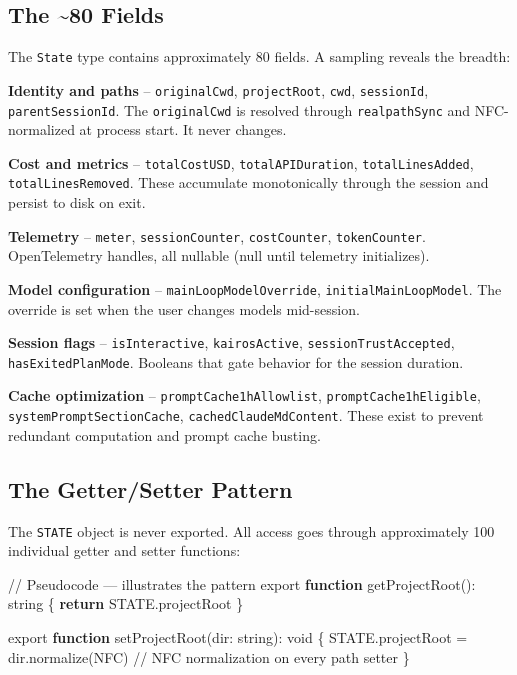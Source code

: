 \documentclass[
  english,
  11pt,
  letterpaper,
]{book}
\newenvironment{Shaded}{\begin{snugshade}}{\end{snugshade}}
\newcommand{\AttributeTok}[1]{\textcolor[rgb]{0.40,0.45,0.13}{#1}}
\newcommand{\CommentTok}[1]{\textcolor[rgb]{0.37,0.37,0.37}{#1}}
\newcommand{\ControlFlowTok}[1]{\textcolor[rgb]{0.00,0.23,0.31}{\textbf{#1}}}
\newcommand{\DataTypeTok}[1]{\textcolor[rgb]{0.68,0.00,0.00}{#1}}
\newcommand{\FunctionTok}[1]{\textcolor[rgb]{0.28,0.35,0.67}{#1}}
\newcommand{\ImportTok}[1]{\textcolor[rgb]{0.00,0.46,0.62}{#1}}
\newcommand{\KeywordTok}[1]{\textcolor[rgb]{0.00,0.23,0.31}{\textbf{#1}}}
\newcommand{\NormalTok}[1]{\textcolor[rgb]{0.00,0.23,0.31}{#1}}
\newcommand{\OperatorTok}[1]{\textcolor[rgb]{0.37,0.37,0.37}{#1}}
\newcommand{\StringTok}[1]{\textcolor[rgb]{0.13,0.47,0.30}{#1}}
\begin{document}
\subsection{The \textasciitilde80 Fields}\label{the-80-fields}

The \texttt{State} type contains approximately 80 fields. A sampling
reveals the breadth:

\textbf{Identity and paths} -- \texttt{originalCwd},
\texttt{projectRoot}, \texttt{cwd}, \texttt{sessionId},
\texttt{parentSessionId}. The \texttt{originalCwd} is resolved through
\texttt{realpathSync} and NFC-normalized at process start. It never
changes.

\textbf{Cost and metrics} -- \texttt{totalCostUSD},
\texttt{totalAPIDuration}, \texttt{totalLinesAdded},
\texttt{totalLinesRemoved}. These accumulate monotonically through the
session and persist to disk on exit.

\textbf{Telemetry} -- \texttt{meter}, \texttt{sessionCounter},
\texttt{costCounter}, \texttt{tokenCounter}. OpenTelemetry handles, all
nullable (null until telemetry initializes).

\textbf{Model configuration} -- \texttt{mainLoopModelOverride},
\texttt{initialMainLoopModel}. The override is set when the user changes
models mid-session.

\textbf{Session flags} -- \texttt{isInteractive}, \texttt{kairosActive},
\texttt{sessionTrustAccepted}, \texttt{hasExitedPlanMode}. Booleans that
gate behavior for the session duration.

\textbf{Cache optimization} -- \texttt{promptCache1hAllowlist},
\texttt{promptCache1hEligible}, \texttt{systemPromptSectionCache},
\texttt{cachedClaudeMdContent}. These exist to prevent redundant
computation and prompt cache busting.

\subsection{The Getter/Setter Pattern}\label{the-gettersetter-pattern}

The \texttt{STATE} object is never exported. All access goes through
approximately 100 individual getter and setter functions:

\begin{Shaded}
\begin{Highlighting}[]
\CommentTok{// Pseudocode — illustrates the pattern}
\ImportTok{export} \KeywordTok{function} \FunctionTok{getProjectRoot}\NormalTok{()}\OperatorTok{:} \DataTypeTok{string}\NormalTok{ \{}
  \ControlFlowTok{return}\NormalTok{ STATE}\OperatorTok{.}\AttributeTok{projectRoot}
\NormalTok{\}}

\ImportTok{export} \KeywordTok{function} \FunctionTok{setProjectRoot}\NormalTok{(dir}\OperatorTok{:} \DataTypeTok{string}\NormalTok{)}\OperatorTok{:} \DataTypeTok{void}\NormalTok{ \{}
\NormalTok{  STATE}\OperatorTok{.}\AttributeTok{projectRoot} \OperatorTok{=}\NormalTok{ dir}\OperatorTok{.}\FunctionTok{normalize}\NormalTok{(}\StringTok{\textquotesingle{}NFC\textquotesingle{}}\NormalTok{)  }\CommentTok{// NFC normalization on every path setter}
\NormalTok{\}}
\end{Highlighting}
\end{Shaded}
\end{document}
